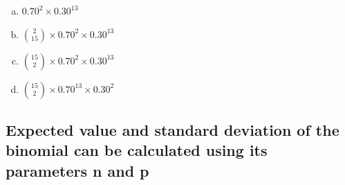 \documentclass[11pt,containsverbatim,handout,xcolor=xelatex,dvipsnames,table]{beamer}
\newcommand{\solnMult}[1]{#1}
\newcommand{\soln}[1]{}
\begin{document}
\begin{frame}


\begin{enumerate}[(a)]
\item $0.70^{2} \times 0.30^{13}$

\item ${2 \choose 15} \times 0.70^{2} \times 0.30^{13}$

\item \solnMult{${15 \choose 2} \times 0.70^{2} \times 0.30^{13}$} \soln{\red{\only<2>{$ = \frac{15!}{13! \times 2!} \times  0.70^{2} \times 0.30^{13} = 105 \times  0.70^{2} \times 0.30^{13} = 8.2e-06$}}}

\item ${15 \choose 2} \times 0.70^{13} \times 0.30^2$

\end{enumerate}

\end{frame}


\subsection{Expected value and standard deviation of the binomial can be calculated using its parameters n and p}
\label{mi2binom}

\end{document}

